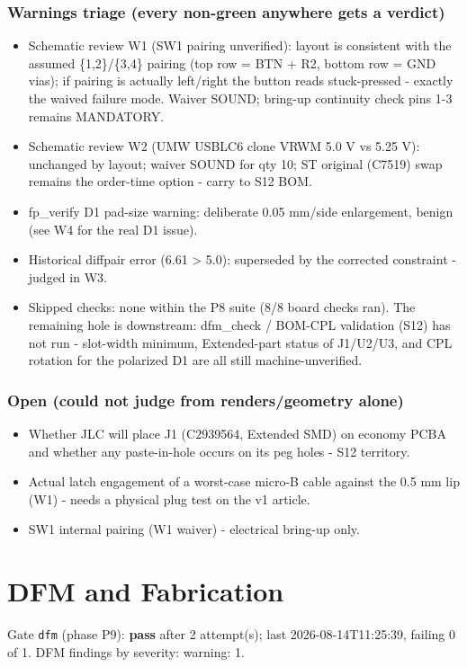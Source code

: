 \documentclass[11pt,a4paper]{article}
\begin{document}
\subsubsection*{Warnings triage (every non-green anywhere gets a verdict)}
\begin{itemize}
\item Schematic review W1 (SW1 pairing unverified): layout is consistent with
the assumed \{1,2\}/\{3,4\} pairing (top row = BTN + R2, bottom row = GND
vias); if pairing is actually left/right the button reads stuck-pressed -
exactly the waived failure mode. Waiver SOUND; bring-up continuity check
pins 1-3 remains MANDATORY.
\item Schematic review W2 (UMW USBLC6 clone VRWM 5.0 V vs 5.25 V): unchanged by
layout; waiver SOUND for qty 10; ST original (C7519) swap remains the
order-time option - carry to S12 BOM.
\item fp\_verify D1 pad-size warning: deliberate 0.05 mm/side enlargement,
benign (see W4 for the real D1 issue).
\item Historical diffpair error (6.61 \textgreater{} 5.0): superseded by the corrected
constraint - judged in W3.
\item Skipped checks: none within the P8 suite (8/8 board checks ran). The
remaining hole is downstream: dfm\_check / BOM-CPL validation (S12) has not
run - slot-width minimum, Extended-part status of J1/U2/U3, and CPL
rotation for the polarized D1 are all still machine-unverified.
\end{itemize}
\subsubsection*{Open (could not judge from renders/geometry alone)}
\begin{itemize}
\item Whether JLC will place J1 (C2939564, Extended SMD) on economy PCBA and
whether any paste-in-hole occurs on its peg holes - S12 territory.
\item Actual latch engagement of a worst-case micro-B cable against the 0.5 mm
lip (W1) - needs a physical plug test on the v1 article.
\item SW1 internal pairing (W1 waiver) - electrical bring-up only.
\end{itemize}
\section{DFM and Fabrication}
Gate \texttt{dfm} (phase P9): \textbf{pass} after 2 attempt(s); last 2026-08-14T11:25:39, failing 0 of 1.
DFM findings by severity: warning: 1.
\end{document}
